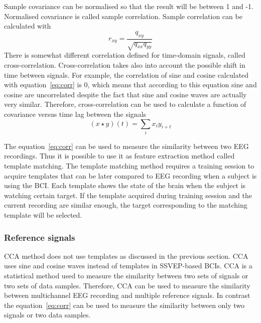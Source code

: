 Sample covariance can be normalised so that the result will be between 1 and -1. Normalised covariance is called sample correlation. Sample correlation can be calculated with
\begin{equation}
	\label{eq:corr}
	r_{xy} = \frac{q_{xy}}{\sqrt{q_{xx}q_{yy}}}
\end{equation}
There is somewhat different correlation defined for time-domain signals, called cross-correlation. Cross-correlation takes also into account the possible shift in time between signals. For example, the correlation of sine and cosine calculated with equation~\ref{eq:corr} is 0, which means that according to this equation sine and cosine are uncorrelated despite the fact that sine and cosine waves are actually very similar. Therefore, cross-correlation can be used to calculate a function of covariance versus time lag between the signals
\begin{equation}
	(x\star y)(t)=\sum_{i}x_iy_{i+t}
\end{equation}

The equation~\ref{eq:corr} can be used to measure the similarity between two \gls{EEG} recordings. Thus it is possible to use it as \gls{feature extraction} method called template matching. The template matching method requires a training session to acquire templates that can be later compared to \gls{EEG} recording when a subject is using the \gls{BCI}. Each template shows the state of the brain when the subject is watching certain \gls{target}. If the template acquired during training session and the current recording are similar enough, the target corresponding to the matching template will be selected.

\subsubsection{Reference signals}

\gls{CCA} method does not use templates as discussed in the previous section. \gls{CCA} uses sine and cosine waves instead of templates in \gls{SSVEP}-based \glspl{BCI}. \gls{CCA} is a statistical method used to measure the similarity between two sets of signals or two sets of data samples. Therefore, \gls{CCA} can be used to measure the similarity between multichannel \gls{EEG} recording and multiple reference signals. In contrast the equation~\ref{eq:corr} can be used to measure the similarity between only two signals or two data samples.


